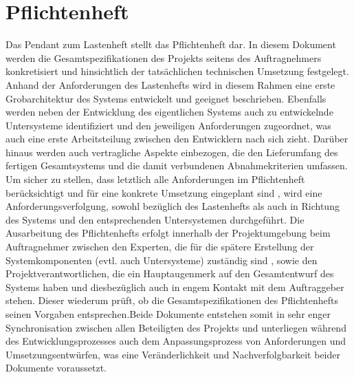 \section{Pflichtenheft}
Das Pendant zum Lastenheft stellt das Pflichtenheft dar. 
In diesem Dokument werden die Gesamtspezifikationen des Projekts seitens des Auftragnehmers konkretisiert und hinsichtlich der tatsächlichen technischen Umsetzung festgelegt. Anhand der Anforderungen des Lastenhefts wird in diesem Rahmen eine erste Grobarchitektur des Systems entwickelt und geeignet beschrieben. Ebenfalls werden neben der Entwicklung des eigentlichen Systems auch zu entwickelnde 
Untersysteme identifiziert und den jeweiligen Anforderungen zugeordnet, was auch eine erste Arbeitsteilung zwischen den Entwicklern nach sich zieht. Darüber hinaus werden auch vertragliche Aspekte einbezogen, die den Lieferumfang des fertigen Gesamtsystems und die damit verbundenen Abnahmekriterien umfassen. Um sicher zu stellen, dass letztlich alle Anforderungen im Pflichtenheft berücksichtigt und für eine konkrete Umsetzung eingeplant sind
, wird eine Anforderungsverfolgung, sowohl bezüglich des Lastenhefts als auch in Richtung des Systems und den entsprechenden Untersystemen durchgeführt. Die Ausarbeitung des Pflichtenhefts erfolgt innerhalb der Projektumgebung beim Auftragnehmer zwischen den Experten, die für die spätere Erstellung der Systemkomponenten (evtl. auch Untersysteme) zuständig sind
, sowie den Projektverantwortlichen, die ein Hauptaugenmerk auf den Gesamtentwurf des Systems haben und diesbezüglich auch in engem Kontakt mit dem Auftraggeber stehen. Dieser wiederum prüft, ob die Gesamtspezifikationen des Pflichtenhefts seinen Vorgaben entsprechen.Beide Dokumente entstehen somit in sehr 
enger Synchronisation zwischen allen Beteiligten des Projekts und unterliegen während des Entwicklungsprozesses auch dem Anpassungsprozess von Anforderungen und Umsetzungsentwürfen, was eine Veränderlichkeit und Nachverfolgbarkeit beider Dokumente voraussetzt.

\cite{brd-lastenheft}

